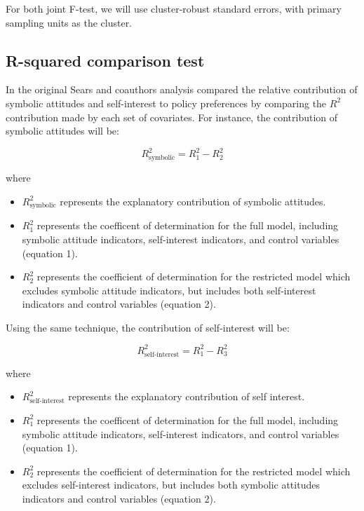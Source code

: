 \documentclass[]{article}
\begin{document}
For both joint F-test, we will use cluster-robust standard errors, with
primary sampling units as the cluster.

\subsection{R-squared comparison test}\label{r-squared-comparison-test}

In the original Sears and coauthors analysis compared the relative
contribution of symbolic attitudes and self-interest to policy
preferences by comparing the \(R^2\) contribution made by each set of
covariates. For instance, the contribution of symbolic attitudes will
be:

\[R^2_{\text{symbolic}} = R^2_1 - R^2_2\]

where

\begin{itemize}
  \item $R^2_{\text{symbolic}}$ represents the explanatory contribution of symbolic attitudes.
  \item $R^2_1$ represents the coefficent of determination for the full model, including symbolic attitude indicators, self-interest indicators, and control variables (equation 1).
  \item $R^2_2$ represents the coefficient of determination for the restricted model which excludes symbolic attitude indicators, but includes both self-interest indicators and control variables (equation 2).
\end{itemize}

Using the same technique, the contribution of self-interest will be:

\[R^2_{\text{self-interest}} = R^2_1 - R^2_3\]

where

\begin{itemize}
  \item $R^2_{\text{self-interest}}$ represents the explanatory contribution of self interest.
  \item $R^2_1$ represents the coefficent of determination for the full model, including symbolic attitude indicators, self-interest indicators, and control variables (equation 1).
  \item $R^2_2$ represents the coefficient of determination for the restricted model which excludes self-interest indicators, but includes both symbolic attitudes indicators and control variables (equation 2).
\end{itemize}
\end{document}
